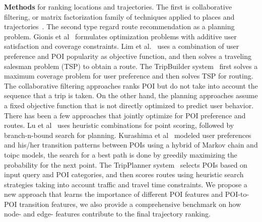 {\bf Methods} for ranking locations and trajectories. 
The first is collaborative filtering, or matrix factorization family of techniques applied to places and trajectories~\cite{shi2011personalized,ijcai13,zhang2015location}. The second type regard route recommendation as a planning problem. Gionis et al~\cite{gioniswsdm14} formulates optimization problems with additive user satisfaction and coverage constraints. Lim et al.~\cite{ijcai15} uses a combination of user preference and POI popularity as objective function, and then solves a traveling salesman problem (TSP) to obtain a route. 
The TripBuilder system~\cite{brilhante2013shall} first solves a maximum coverage problem for user preference and then solves TSP for routing. The collaborative filtering approaches ranks POI but do not take into account the sequence that a trip is taken. On the other hand, the planning approaches assume a fixed objective function that is not directly optimized to predict user behavior. There has been a few approaches that jointly optimize for POI preference and routes. Lu et al~\cite{lu2012personalized} uses heuristic combinations for point scoring, followed by branch-n-bound search for planning. Kurashima et al~\cite{kurashima2010geotag} modeled user preferences and his/her transition patterns between POIs using a hybrid of Markov chain and toipc models, the search for a best path is done by greedily maximizing the probability for the next point. The TripPlanner system~\cite{chen2015tripplanner} selects POIs based on input query and POI categories, and then scores routes using heuristic search strategies taking into account traffic and travel time constraints. 
We propose a new approach that learns the importance of different POI features and POI-to-POI transition features, we also provide a comprehensive benchmark on how node- and edge- features contribute to the final trajectory ranking. 



